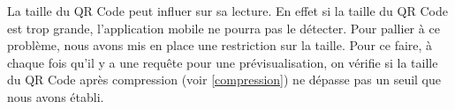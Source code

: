 \par
La taille du QR Code peut influer sur sa lecture. En effet si la taille du QR Code est trop grande, l'application mobile ne pourra pas le détecter. Pour pallier à ce problème, nous avons mis en place une restriction sur la taille. Pour ce faire, à chaque fois qu'il y a une requête pour une prévisualisation, on vérifie si la taille du QR Code après compression (voir \ref{compression}) ne dépasse pas un seuil que nous avons établi.\\
